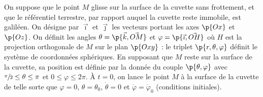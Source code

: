 \documentclass[a4paper,french,bookmarks]{article}
\begin{document}
    \begin{minipage}{0.5\linewidth}
        On suppose que le point $M$ glisse sur la surface de la cuvette sans frottement, et que le référentiel terrestre, par rapport auquel la cuvette reste immobile, est galiléen. On désigne par $\vec \imath$ et $\vec \jmath$ les vecteurs portant les axes $\p{Ox}$ et $\p{Oz}$. On définit les angles $\theta = \p{\vec k, \vec{OM}}$ et $\varphi = \p{\vec \imath, \vec{OH}}$ où $H$ est la projection orthogonale de $M$ sur le plan $\p{Oxy}$ : le triplet $\p{r, \theta, \varphi}$ définit le système de coordonnées sphériques. En supposant que $M$ reste sur la surface de la cuvette, sa position est définie par la donnée du couple $\p{\theta, \varphi}$ avec $\sfrac{\pi}{2} \leq \theta \leq \pi$ et $0 \leq \varphi \leq 2\pi$. À $t = 0$, on lance le point $M$ à la surface de la cuvette de telle sorte que $\varphi = 0$, $\theta = \theta_0$, $\dot \theta = 0$ et $\dot \varphi = \dot \varphi_0$ (conditions initiales).
    \end{minipage}
    \hfill
\end{document}
